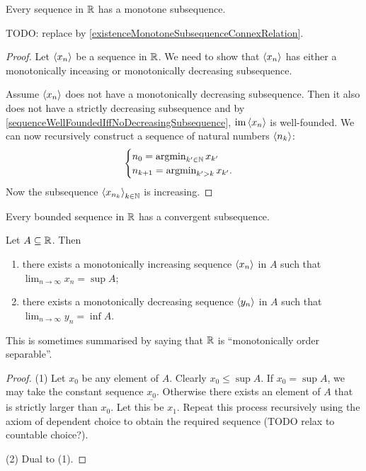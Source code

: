 \begin{proposition} \label{monotoneSubsequenceRealSequence}
Every sequence in $\mathbb{R}$ has a monotone subsequence.
\end{proposition}
TODO: replace by \ref{existenceMonotoneSubsequenceConnexRelation}.
\begin{proof}
Let $\left\langle x_n \right\rangle$ be a sequence in $\mathbb{R}$. We need to show that $\left\langle x_n \right\rangle$ has either a monotonically inceasing or monotonically decreasing subsequence.

Assume $\left\langle x_n \right\rangle$ does not have a monotonically decreasing subsequence. Then it also does not have a strictly decreasing subsequence and by \ref{sequenceWellFoundedIffNoDecreasingSubsequence}, $\operatorname{im}\left\langle x_n \right\rangle$ is well-founded. We can now recursively construct a sequence of natural numbers $\left\langle n_k \right\rangle$:
\[ \begin{cases}
n_0 = \operatorname{argmin}_{k'\in \mathbb{N}}x_{k'} \\
n_{k+1} = \operatorname{argmin}_{k'> k}x_{k'}.
\end{cases} \]
Now the subsequence $\left\langle x_{n_k} \right\rangle_{k\in \mathbb{N}}$ is increasing.
\end{proof}
\begin{corollary}
Every bounded sequence in $\mathbb{R}$ has a convergent subsequence. 
\end{corollary}


\begin{proposition} \label{sequencesToExtrema}
Let $A\subseteq \mathbb{R}$. Then
\begin{enumerate}
\item there exists a monotonically increasing sequence $\left\langle x_n \right\rangle$ in $A$ such that $\lim_{n\to\infty}x_n = \sup A$;
\item there exists a monotonically decreasing sequence $\left\langle y_n \right\rangle$ in $A$ such that $\lim_{n\to\infty}y_n = \inf A$.
\end{enumerate}
\end{proposition}
This is sometimes summarised by saying that $\mathbb{R}$ is ``monotonically order separable''.
\begin{proof}
(1) Let $x_0$ be any element of $A$. Clearly $x_0\leq \sup A$. If $x_0 = \sup A$, we may take the constant sequence $\underline{x_0}$. Otherwise there exists an element of $A$ that is strictly larger than $x_0$. Let this be $x_1$. Repeat this process recursively using the axiom of dependent choice to obtain the required sequence (TODO relax to countable choice?).

(2) Dual to (1).
\end{proof}

